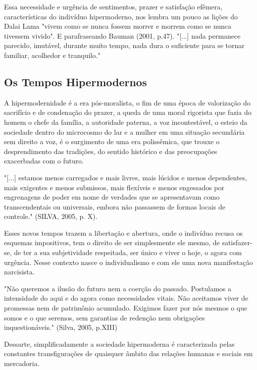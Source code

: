 \documentclass{article}
\begin{document}
Essa necessidade e urgência de sentimentos, prazer e satisfação efêmera, características do 
indivíduo hipermoderno, nos lembra um pouco as lições do Dalai Lama "vivem como se 
nunca fossem morrer e morrem como se nunca tivessem vivido". E parafraseando Bauman 
(2001, p.47). "[...] nada permanece parecido, imutável, durante muito tempo, nada dura o 
suficiente para se tornar familiar, acolhedor e tranquilo." 
\newpage
\begin{multicols}{2}

   \subsection*{Os Tempos Hipermodernos}
A hipermodernidade é a era pós-moralista, o fim de uma época de valorização do sacrifício e 
de condenação do prazer, a queda de uma moral rigorista que fazia do homem o chefe da 
família, a autoridade paterna, a voz incontestável, o esteio da sociedade dentro do 
microcosmo do lar e a mulher em uma situação secundária sem direito a voz, é o surgimento 
de uma era polissêmica, que trouxe o desprendimento das tradições, do sentido histórico e das 
preocupações exacerbadas com o futuro.


"[...] estamos menos carregados e mais livres, mais lúcidos e menos dependentes, mais 
exigentes e menos submissos, mais flexíveis e menos engessados por engrenagens de 
poder em nome de verdades que se apresentavam como transcendentais ou universais, 
embora não passassem de formas locais de controle." (SILVA, 2005, p. X).


Esses novos tempos trazem a libertação e abertura, onde o indivíduo recusa os esquemas 
impositivos, tem o direito de ser simplesmente ele mesmo, de satisfazer-se, de ter a sua 
subjetividade respeitada, ser único e viver o hoje, o agora com urgência. Nesse contexto nasce 
o individualismo e com ele uma nova manifestação narcisista.


"Não queremos a ilusão do futuro nem a coerção do passado. Postulamos a 
intensidade do aqui e do agora como necessidades vitais. Não aceitamos viver de 
promessas nem de patrimônio acumulado. Exigimos fazer por nós mesmos o que 
somos e o que seremos, sem garantias de redenção nem obrigações inquestionáveis."
(Silva, 2005, p.XIII)

Dessarte, simplificadamente a sociedade hipermoderna é caracterizada pelas constantes transfigurações de quaisquer âmbito das relações humanas e sociais em mercadoria. 
\vspace{85mm}

\end{multicols}
\end{document}
